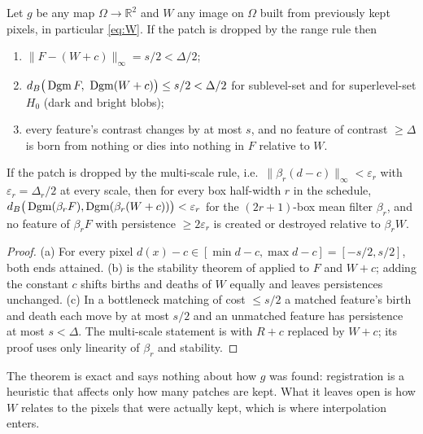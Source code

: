 \begin{theorem}
\label{thm:warp}
Let $g$ be any map $\Omega \to \mathbb{R}^2$ and $W$ any image on $\Omega$ built from previously kept pixels, in particular \eqref{eq:W}. If the patch is dropped by the range rule then
\begin{enumerate}[label=(\alph*)]
\item $\lVert F - (W + c) \rVert_\infty = s/2 < \Delta/2$;
\item $d_B\big(\operatorname{Dgm} F,\ \operatorname{Dgm}(W + c)\big) \le s/2 < \Delta/2$ for sublevel-set and for superlevel-set $H_0$ (dark and bright blobs);
\item every feature's contrast changes by at most $s$, and no feature of contrast $\ge \Delta$ is born from nothing or dies into nothing in $F$ relative to $W$.
\end{enumerate}
If the patch is dropped by the multi-scale rule, i.e.\ $\lVert \beta_r(d - c) \rVert_\infty < \varepsilon_r$ with $\varepsilon_r = \Delta_r/2$ at every scale, then for every box half-width $r$ in the schedule, $d_B\big(\operatorname{Dgm}(\beta_r F), \operatorname{Dgm}(\beta_r(W + c))\big) < \varepsilon_r$ for the $(2r{+}1)$-box mean filter $\beta_r$, and no feature of $\beta_r F$ with persistence $\ge 2\varepsilon_r$ is created or destroyed relative to $\beta_r W$.
\end{theorem}

\begin{proof}
(a) For every pixel $d(x) - c \in [\min d - c, \max d - c] = [-s/2, s/2]$, both ends attained. (b) is the stability theorem of \citet{cohensteiner2007} applied to $F$ and $W + c$; adding the constant $c$ shifts births and deaths of $W$ equally and leaves persistences unchanged. (c) In a bottleneck matching of cost $\le s/2$ a matched feature's birth and death each move by at most $s/2$ and an unmatched feature has persistence at most $s < \Delta$. The multi-scale statement is \citet[Theorem 5]{nair2026certifiedskip} with $R + c$ replaced by $W + c$; its proof uses only linearity of $\beta_r$ and stability.
\end{proof}

The theorem is exact and says nothing about how $g$ was found: registration is a heuristic that affects only how many patches are kept. What it leaves open is how $W$ relates to the pixels that were actually kept, which is where interpolation enters.

